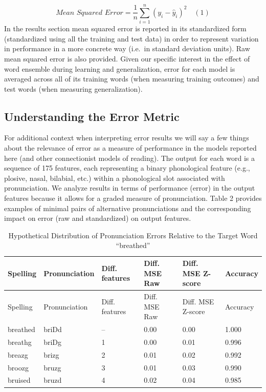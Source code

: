 \documentclass[
  ,man,floatsintext]{apa6}
\begin{document}
\[
\textit{Mean Squared Error} = \frac{1}{n} \sum_{i=1}^{n} (y_i - \hat{y}_i)^2
\quad (1) 
\]
In the results section mean squared error is reported in its standardized form (standardized using all the training and test data) in order to represent variation in performance in a more concrete way (i.e.~in standard deviation units). Raw mean squared error is also provided. Given our specific interest in the effect of word ensemble during learning and generalization, error for each model is averaged across all of its training words (when measuring training outcomes) and test words (when measuring generalization).

\subsection{Understanding the Error Metric}\label{understanding-the-error-metric}

For additional context when interpreting error results we will say a few things about the relevance of error as a measure of performance in the models reported here (and other connectionist models of reading). The output for each word is a sequence of 175 features, each representing a binary phonological feature (e.g., plosive, nasal, bilabial, etc.) within a phonological slot associated with pronunciation. We analyze results in terms of performance (error) in the output features because it allows for a graded measure of pronunciation. Table 2 provides examples of minimal pairs of alternative pronunciations and the corresponding impact on error (raw and standardized) on output features.

\begin{longtable}[]{@{}llllll@{}}
\caption{\label{tab:table2} Hypothetical Distribution of Pronunciation Errors Relative to the Target Word ``breathed''}\tabularnewline
\toprule\noalign{}
Spelling & Pronunciation & Diff. features & Diff. MSE Raw & Diff. MSE Z-score & Accuracy \\
\midrule\noalign{}
\endfirsthead
\toprule\noalign{}
Spelling & Pronunciation & Diff. features & Diff. MSE Raw & Diff. MSE Z-score & Accuracy \\
\midrule\noalign{}
\endhead
\bottomrule\noalign{}
\endlastfoot
breathed & briDd & -- & 0.00 & 0.00 & 1.000 \\
breathg & briDg & 1 & 0.00 & 0.01 & 0.996 \\
breazg & brizg & 2 & 0.01 & 0.02 & 0.992 \\
broozg & bruzg & 3 & 0.01 & 0.03 & 0.990 \\
bruised & bruzd & 4 & 0.02 & 0.04 & 0.985 \\
\end{longtable}
\end{document}

